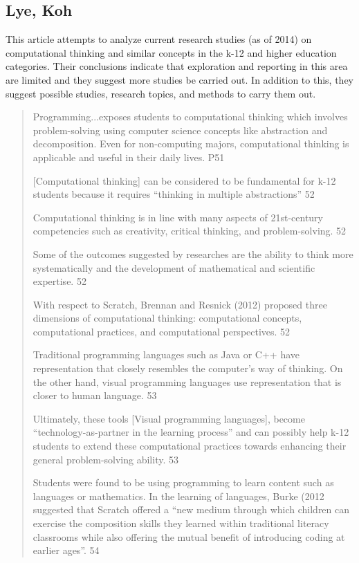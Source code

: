 \documentclass[12pt]{extarticle}
\begin{document}
{\subsection*{Lye, Koh}
This article attempts to analyze current research studies (as of 2014) on computational thinking and similar concepts in the k-12 and higher education categories. Their conclusions indicate that exploration and reporting in this area are limited and they suggest more studies be carried out. In addition to this, they suggest possible studies, research topics, and methods to carry them out. 
\begin{quote}
    
    Programming...exposes students to computational thinking which involves problem-solving using computer science concepts like abstraction and decomposition. Even for non-computing majors, computational thinking is applicable and useful in their daily lives. P51
    
    [Computational thinking] can be considered to be fundamental for k-12 students because it requires “thinking in multiple abstractions” 52
    
    Computational thinking is in line with many aspects of 21st-century competencies such as creativity, critical thinking, and problem-solving. 52
    
    Some of the outcomes suggested by researches are the ability to think more systematically and the development of mathematical and scientific expertise. 52
    
    With respect to Scratch, Brennan and Resnick (2012) proposed three dimensions of computational thinking: computational concepts, computational practices, and computational perspectives. 52
    
    Traditional programming languages such as Java or C++ have representation that closely resembles the computer’s way of thinking. On the other hand, visual programming languages use representation that is closer to human language. 53
    
    Ultimately, these tools [Visual programming languages],  become “technology-as-partner in the learning process” and can possibly help k-12 students to extend these computational practices towards enhancing their general problem-solving ability. 53
    
    Students were found to be using programming to learn content such as languages or mathematics. In the learning of languages, Burke (2012 suggested that Scratch offered a  “new medium through which children can exercise the composition skills they learned within traditional literacy classrooms while also offering the mutual benefit of introducing coding at earlier ages”. 54
    

\end{quote}}
\end{document}
